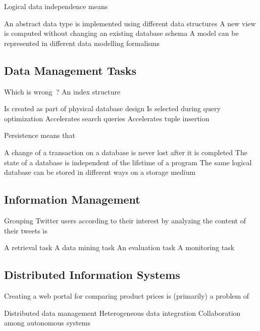 \documentclass[12pt,a4paper]{exam} %
\begin{document}
\begin{flushleft}
\begin{multicols*}{2}
\begin{questions}
\question Logical data independence means
\begin{checkboxes}
\choice An abstract data type is implemented using different data structures
\choice A new view is computed without changing an existing database schema
\choice A model can be represented in different data modelling formalisms
\end{checkboxes}


\subsection{Data Management Tasks}

\question Which is wrong~? An index structure
\begin{checkboxes}
\choice Is created as part of physical database design
\choice Is selected during query optimization
\choice Accelerates search queries
\choice Accelerates tuple insertion
\end{checkboxes}

\question Persistence means that
\begin{checkboxes}
\choice A change of a transaction on a database is never lost after it is completed
\choice The state of a database is independent of the lifetime of a program
\choice The same logical database can be stored in different ways on a storage medium
\end{checkboxes}


\subsection{Information Management}

\question Grouping Twitter users according to their interest by analyzing the content of their tweets is
\begin{checkboxes}
\choice A retrieval task
\choice A data mining task
\choice An evaluation task
\choice A monitoring task
\end{checkboxes}


\subsection{Distributed Information Systems}

\question Creating a web portal for comparing product prices is (primarily) a problem of
\begin{checkboxes}
\choice Distributed data management
\choice Heterogeneous data integration
\choice Collaboration among autonomous systems
\end{checkboxes}



\end{questions}
\end{multicols*}
\end{flushleft}
\end{document}
